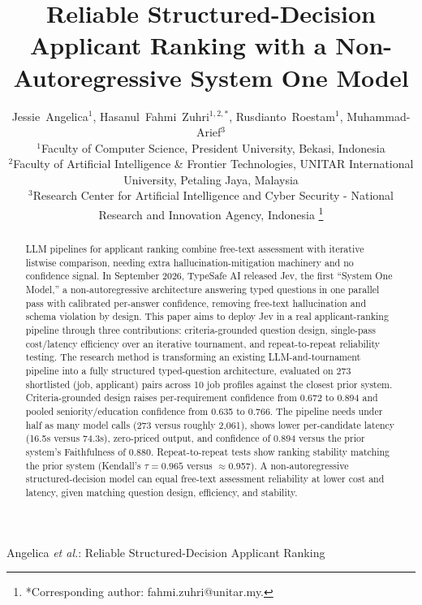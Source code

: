 \documentclass[journal]{IEEEtran}
\begin{document}
\title{Reliable Structured-Decision Applicant Ranking with a Non-Autoregressive System One Model}

\author{Jessie~Angelica$^{1}$, Hasanul~Fahmi~Zuhri$^{1,2,*}$, Rusdianto~Roestam$^{1}$,
Muhammad-Arief$^{3}$\\[0.5em]
{\normalsize $^{1}$Faculty of Computer Science, President University, Bekasi, Indonesia\\
$^{2}$Faculty of Artificial Intelligence \& Frontier Technologies, UNITAR International University, Petaling Jaya, Malaysia\\
$^{3}$Research Center for Artificial Intelligence and Cyber Security - National Research and Innovation Agency, Indonesia}%
\thanks{*Corresponding author: fahmi.zuhri@unitar.my.}}

%
{Angelica \MakeLowercase{\textit{et al.}}: Reliable Structured-Decision Applicant Ranking}

\maketitle

\begin{abstract}
LLM pipelines for applicant ranking combine free-text assessment with iterative listwise comparison, needing extra hallucination-mitigation machinery and no confidence signal. In September 2026, TypeSafe AI released Jev, the first ``System One Model,'' a non-autoregressive architecture answering typed questions in one parallel pass with calibrated per-answer confidence, removing free-text hallucination and schema violation by design. This paper aims to deploy Jev in a real applicant-ranking pipeline through three contributions: criteria-grounded question design, single-pass cost/latency efficiency over an iterative tournament, and repeat-to-repeat reliability testing. The research method is transforming an existing LLM-and-tournament pipeline into a fully structured typed-question architecture, evaluated on 273 shortlisted (job, applicant) pairs across 10 job profiles against the closest prior system. Criteria-grounded design raises per-requirement confidence from 0.672 to 0.894 and pooled seniority/education confidence from 0.635 to 0.766. The pipeline needs under half as many model calls (273 versus roughly 2,061), shows lower per-candidate latency (16.5s versus 74.3s), zero-priced output, and confidence of 0.894 versus the prior system's Faithfulness of 0.880. Repeat-to-repeat tests show ranking stability matching the prior system (Kendall's $\tau=0.965$ versus $\approx$0.957). A non-autoregressive structured-decision model can equal free-text assessment reliability at lower cost and latency, given matching question design, efficiency, and stability.
\end{abstract}
\end{document}
